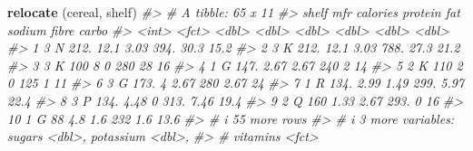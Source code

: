 \documentclass[
]{book}
\newenvironment{Shaded}{\begin{snugshade}}{\end{snugshade}}
\newcommand{\CommentTok}[1]{\textcolor[rgb]{0.56,0.35,0.01}{\textit{#1}}}
\newcommand{\FunctionTok}[1]{\textcolor[rgb]{0.13,0.29,0.53}{\textbf{#1}}}
\newcommand{\NormalTok}[1]{#1}
\begin{document}
\begin{Shaded}
\begin{Highlighting}[]
\FunctionTok{relocate}\NormalTok{ (cereal, shelf)}
\CommentTok{\#\textgreater{} \# A tibble: 65 x 11}
\CommentTok{\#\textgreater{}    shelf mfr   calories protein   fat sodium fibre carbo}
\CommentTok{\#\textgreater{}    \textless{}int\textgreater{} \textless{}fct\textgreater{}    \textless{}dbl\textgreater{}   \textless{}dbl\textgreater{} \textless{}dbl\textgreater{}  \textless{}dbl\textgreater{} \textless{}dbl\textgreater{} \textless{}dbl\textgreater{}}
\CommentTok{\#\textgreater{}  1     3 N         212.   12.1   3.03   394. 30.3   15.2}
\CommentTok{\#\textgreater{}  2     3 K         212.   12.1   3.03   788. 27.3   21.2}
\CommentTok{\#\textgreater{}  3     3 K         100     8     0      280  28     16  }
\CommentTok{\#\textgreater{}  4     1 G         147.    2.67  2.67   240   2     14  }
\CommentTok{\#\textgreater{}  5     2 K         110     2     0      125   1     11  }
\CommentTok{\#\textgreater{}  6     3 G         173.    4     2.67   280   2.67  24  }
\CommentTok{\#\textgreater{}  7     1 R         134.    2.99  1.49   299.  5.97  22.4}
\CommentTok{\#\textgreater{}  8     3 P         134.    4.48  0      313.  7.46  19.4}
\CommentTok{\#\textgreater{}  9     2 Q         160     1.33  2.67   293.  0     16  }
\CommentTok{\#\textgreater{} 10     1 G          88     4.8   1.6    232   1.6   13.6}
\CommentTok{\#\textgreater{} \# i 55 more rows}
\CommentTok{\#\textgreater{} \# i 3 more variables: sugars \textless{}dbl\textgreater{}, potassium \textless{}dbl\textgreater{},}
\CommentTok{\#\textgreater{} \#   vitamins \textless{}fct\textgreater{}}


\end{Highlighting}
\end{Shaded}
\end{document}
